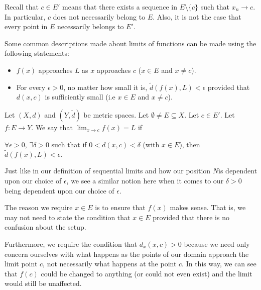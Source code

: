\documentclass[a4paper]{article}
\begin{document}
Recall that \( c \in E' \) means that there exists a sequence in \( E \setminus  \{ c  \}  \) such that \( {x}_{n} \to c  \). In particular, \( c  \) does not necessarily belong to \( E  \). Also, it is not the case that every point in \( E  \) necessarily belongs to \( E' \).

Some common descriptions made about limits of functions can be made using the following statements:

\begin{itemize}
    \item \( f(x)  \) approaches \( L  \) as \( x  \) approaches \( c  \) (\( x \in E  \) and \( x \neq c  \)).
    \item For every \( \epsilon > 0  \), no matter how small it is, \( \tilde{d}(f(x), L) < \epsilon  \) provided that \( d(x,c) \) is sufficiently small (i.e \( x \in E  \) and \( x \neq c \)).
\end{itemize}

\begin{definition}
    Let \( (X,d) \) and \( (Y,\tilde{d}) \) be metric spaces. Let \( \emptyset \neq E \subseteq X  \). Let \( c \in E' \). Let \( f: E \to Y \). We say that \( \lim_{ x  \to c  }  f(x) = L  \) if 
    \begin{center}
        \( \forall \epsilon > 0  \), \( \exists \delta > 0  \) such that if \( 0 < d(x,c) < \delta  \) (with \( x \in E  \)), then \( \tilde{d}(f(x), L) < \epsilon. \)
    \end{center}
\end{definition}

\begin{remark}
    Just like in our definition of sequential limits and how our position \( N \)is dependent upon our choice of \( \epsilon  \), we see a similar notion here when it comes to our \( \delta > 0  \) being dependent upon our choice of \( \epsilon  \).
\end{remark}

The reason we require \( x \in E  \) is to ensure that \( f(x)  \) makes sense. That is, we may not need to state the condition that \( x \in E  \) provided that there is no confusion about the setup. 

Furthermore, we require the condition that \( {d}_{x}(x,c) > 0  \) because we need only concern ourselves with what happens as the points of our domain approach the limit point \( c  \), not necessarily what happens at the point \( c  \). In this way, we can see that \( f(c) \) could be changed to anything (or could not even exist) and the limit would still be unaffected.
\end{document}
